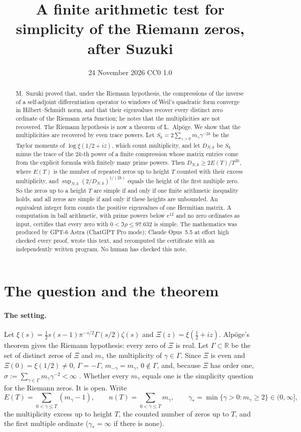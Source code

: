 \documentclass[11pt,a4paper]{article}
\title{A finite arithmetic test for simplicity of the Riemann zeros,\\ after Suzuki}
\author{}
\date{24 November 2026 \quad CC0 1.0}
\theoremstyle{plain}
\theoremstyle{remark}
\newcommand{\R}{\mathbb R}
\begin{document}
\maketitle

\begin{abstract}
\noindent
M.~Suzuki proved that, under the Riemann hypothesis, the compressions of the inverse of a self-adjoint
differentiation operator to windows of Weil's quadratic form converge in Hilbert--Schmidt norm, and that their
eigenvalues recover every distinct zero ordinate of the Riemann zeta function; he notes that the multiplicities are
not recovered. The Riemann hypothesis is now a theorem of L.~Alp\"oge. We show that the multiplicities are recovered
by even trace powers. Let $S_k=2\sum_{\gamma>0}m_\gamma\gamma^{-2k}$ be the Taylor moments of $\log\xi(1/2+iz)$,
which count multiplicity, and let $D_{N,k}$ be $S_k$ minus the trace of the $2k$-th power of a finite compression
whose matrix entries come from the explicit formula with finitely many prime powers. Then
$D_{N,k}\ge 2E(T)/T^{2k}$, where $E(T)$ is the number of repeated zeros up to height $T$ counted with their excess
multiplicity, and $\sup_{N,k}(2/D_{N,k})^{1/(2k)}$ equals the height of the first multiple zero. So the zeros up to a
height $T$ are simple if and only if one finite arithmetic inequality holds, and all zeros are simple if and only if
these heights are unbounded. An equivalent integer form counts the positive eigenvalues of one Hermitian matrix. A
computation in ball arithmetic, with prime powers below $e^{12}$ and no zero ordinates as input, certifies that every
zero with $0<\Im\rho\le 97.632$ is simple. The mathematics was produced by GPT-6 Astra (ChatGPT Pro mode); Claude
Opus~5.5 at effort high checked every proof, wrote this text, and recomputed the certificate with an independently
written program. No human has checked this note.
\end{abstract}

\section{The question and the theorem}

\paragraph{The setting.}
Let $\xi(s)=\frac12 s(s-1)\pi^{-s/2}\Gamma(s/2)\zeta(s)$ and $\Xi(z)=\xi(\tfrac12+iz)$. Alp\"oge's theorem
\cite{alpoge,lean} gives the Riemann hypothesis: every zero of $\Xi$ is real. Let $\Gamma\subset\R$ be the set of
distinct zeros of $\Xi$ and $m_\gamma$ the multiplicity of $\gamma\in\Gamma$. Since $\Xi$ is even and
$\Xi(0)=\xi(1/2)\ne0$, $\Gamma=-\Gamma$, $m_{-\gamma}=m_\gamma$, $0\notin\Gamma$, and, because $\Xi$ has order one,
$\sigma:=\sum_{\gamma\in\Gamma}m_\gamma\gamma^{-2}<\infty$ \cite[(2.2)]{suzuki}. Whether every $m_\gamma$ equals
one is the simplicity question for the Riemann zeros. It is open. Write
\[
 E(T)=\sum_{0<\gamma\le T}(m_\gamma-1),\qquad
 n(T)=\sum_{0<\gamma\le T}m_\gamma,\qquad
 \gamma_*=\min\{\gamma>0:m_\gamma\ge2\}\in(0,\infty],
\]
the multiplicity excess up to height $T$, the counted number of zeros up to $T$, and the first multiple ordinate
($\gamma_*=\infty$ if there is none).
\end{document}
